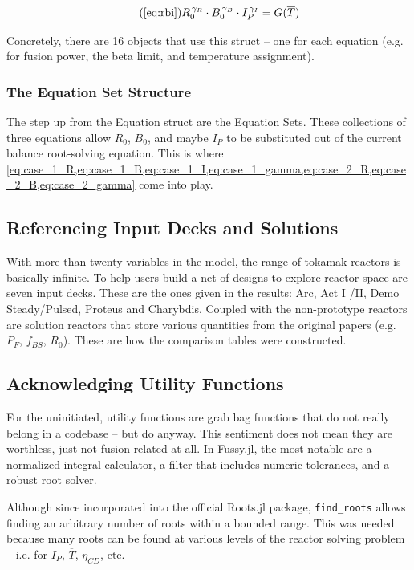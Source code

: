 \begin{equation}
	\tag{\ref{eq:rbi}}
	R_0^{\, \gamma_R} \cdot B_0^{\, \gamma_B} \cdot I_P^{\, \gamma_I} = G( \overline T )
\end{equation}

Concretely, there are 16 objects that use this struct -- one for each equation (e.g. for fusion power, the beta limit, and temperature assignment).

\subsubsection{The Equation Set Structure}

The step up from the Equation struct are the Equation Sets. These collections of three equations allow $R_0$, $B_0$, and maybe $I_P$ to be substituted out of the current balance root-solving equation. This is where \cref{eq:case_1_R,eq:case_1_B,eq:case_1_I,eq:case_1_gamma,eq:case_2_R,eq:case_2_B,eq:case_2_gamma} come into play.

\subsection{Referencing Input Decks and Solutions}

With more than twenty  variables in the model, the range of tokamak reactors is basically infinite. To help users build a net of designs to explore reactor space are seven input decks. These are the ones given in the results: Arc, Act I /II, Demo Steady/Pulsed, Proteus and Charybdis. Coupled with the non-prototype reactors are solution reactors that store various quantities from the original papers (e.g. $P_F$, $f_{BS}$, $R_0$). These are how the comparison tables were constructed.

\subsection{Acknowledging Utility Functions}

For the uninitiated, utility functions are grab bag functions that do not really belong in a codebase -- but do anyway. This sentiment does not mean they are worthless, just not fusion related at all. In Fussy.jl, the most notable are a normalized integral calculator, a filter that includes numeric tolerances, and a robust root solver. 

Although since incorporated into the official Roots.jl package, \texttt{find\_roots} allows finding an arbitrary number of roots within a bounded range. This was needed because many roots can be found at various levels of the reactor solving problem -- i.e. for $I_P$, $\overline T$, $\eta_{CD}$, etc.

